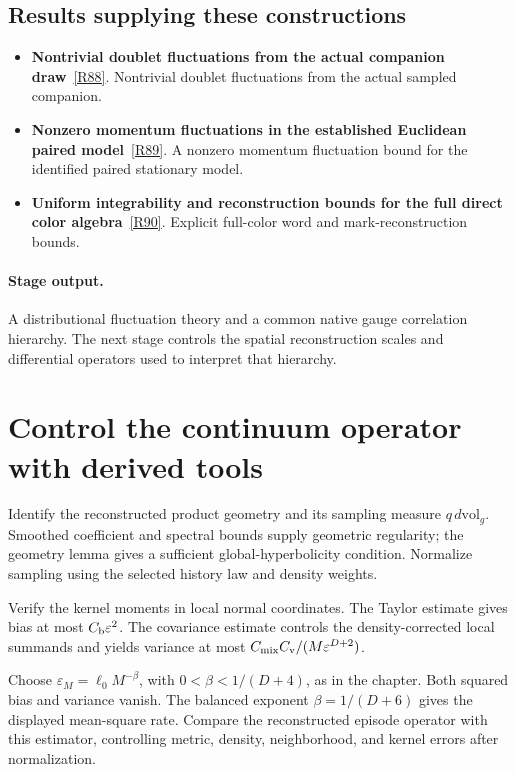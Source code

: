 \documentclass[11pt,a4paper]{article}
\begin{document}
\subsection*{Results supplying these constructions}
\begin{itemize}
\item \textbf{Nontrivial doublet fluctuations from the actual companion draw}~\hyperref[src:thm-sm-native-doublet-fluctuations]{[R88]}. Nontrivial doublet fluctuations from the actual sampled companion.
\item \textbf{Nonzero momentum fluctuations in the established Euclidean paired model}~\hyperref[src:cor-ym-paired-momentum-fluctuations]{[R89]}. A nonzero momentum fluctuation bound for the identified paired stationary model.
\item \textbf{Uniform integrability and reconstruction bounds for the full direct color algebra}~\hyperref[src:lem-ym-physical-gauge-word-uniform-integrability]{[R90]}. Explicit full-color word and mark-reconstruction bounds.
\end{itemize}
\paragraph{Stage output.} A distributional fluctuation theory and a common native gauge correlation hierarchy. The next stage controls the spatial reconstruction scales and differential operators used to interpret that hierarchy.

\section{Control the continuum operator with derived tools}
\label{stage:15}
Identify the reconstructed product geometry and its sampling measure \(q\,d\mathrm{vol}_g\). Smoothed coefficient and spectral bounds supply geometric regularity; the geometry lemma gives a sufficient global-hyperbolicity condition. Normalize sampling using the selected history law and density weights.

Verify the kernel moments in local normal coordinates. The Taylor estimate gives bias at most \(C_{\rm b}\varepsilon^2\). The covariance estimate controls the density-corrected local summands and yields variance at most \(C_{\rm mix}C_{\rm v}/(M\varepsilon^{D+2})\).

Choose \(\varepsilon_M=\ell_0M^{-\beta}\), with \(0<\beta<1/(D+4)\), as in the chapter. Both squared bias and variance vanish. The balanced exponent \(\beta=1/(D+6)\) gives the displayed mean-square rate. Compare the reconstructed episode operator with this estimator, controlling metric, density, neighborhood, and kernel errors after normalization.
\end{document}
